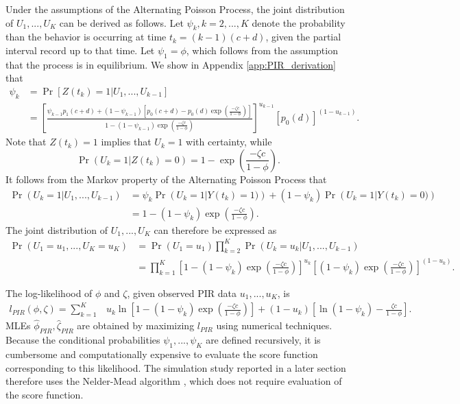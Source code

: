 \documentclass[man, noextraspace, floatsintext]{apa6}\usepackage[]{graphicx}\usepackage[]{color}
\begin{document}
Under the assumptions of the Alternating Poisson Process, the joint distribution of $U_1,...,U_K$ can be derived as follows. 
Let $\psi_k, k = 2,...,K$ denote the probability than the behavior is occurring at time $t_k = (k-1)(c + d)$, given the partial interval record up to that time. 
Let $\psi_1 = \phi$, which follows from the assumption that the process is in equilibrium. We show in Appendix \ref{app:PIR_derivation} that  
\begin{equation}
\label{eq:psi_k}
\begin{aligned}
\psi_k &= \Pr\left[ Z(t_k) = 1 \left| U_1,...,U_{k-1}\right.\right] \\
 &= \left[\frac{\psi_{k-1} p_1(c + d) + (1 - \psi_{k-1}) \left[p_0(c + d) - p_0(d) \exp\left(\frac{- \zeta c}{1 - \phi}\right)\right]}{1 - (1 - \psi_{k-1})\exp\left( \frac{-\zeta c}{1 - \phi}\right)}\right]^{u_{k-1}} \left[p_0(d)\right]^{(1 - u_{k-1})}.
\end{aligned}
\end{equation}
Note that $Z(t_k) = 1$ implies that $U_k = 1$ with certainty, while 
\[ \Pr\left(U_k = 1\left| Z(t_k) = 0\right.\right) = 1 - \exp\left( \frac{-\zeta c}{1 - \phi}\right).\]
It follows from the Markov property of the Alternating Poisson Process that 
\begin{align*}
\Pr\left(U_k = 1 \left| U_1,...,U_{k-1}\right.\right) &= \psi_k \Pr\left(U_k = 1 \left| Y(t_k) = 1)\right.\right)  + (1 - \psi_k)\Pr\left(U_k = 1 \left| Y(t_k) = 0)\right.\right) \\
&= 1 - (1 - \psi_k)\exp\left( \frac{-\zeta c}{1 - \phi}\right).
\end{align*}
The joint distribution of $U_1,...,U_K$ can therefore be expressed as 
\begin{align*}
\Pr\left(U_1=u_1,...,U_K = u_K\right) &= \Pr\left(U_1=u_1\right) \prod_{k=2}^K \Pr\left(U_k=u_k \left| U_1,...,U_{k-1}\right.\right) \nonumber \\
&= \prod_{k=1}^K \left[1 - (1 - \psi_k)\exp\left( \frac{-\zeta c}{1 - \phi}\right) \right]^{u_k} \left[(1 - \psi_k)\exp\left( \frac{-\zeta c}{1 - \phi}\right)\right]^{(1 - u_k)}.
\end{align*}

The log-likelihood of $\phi$ and $\zeta$, given observed PIR data $u_1,...,u_K$, is
\begin{align}
\label{eq:PIR_loglik}
l_{PIR}\left(\phi,\zeta\right) = \sum_{k=1}^K & u_k \ln\left[1 - (1 - \psi_k)\exp\left( \frac{-\zeta c}{1 - \phi}\right)\right]  + (1 - u_k)\left[\ln\left(1 - \psi_k \right) - \frac{\zeta c}{1 - \phi}\right].
\end{align}
MLEs $\hat\phi_{PIR}, \hat\zeta_{PIR}$ are obtained by maximizing $l_{PIR}$ using numerical techniques. 
Because the conditional probabilities $\psi_1,...,\psi_K$ are defined recursively, it is cumbersome and computationally expensive to evaluate the score function corresponding to this likelihood. 
The simulation study reported in a later section therefore uses the Nelder-Mead algorithm \citep{Nelder1965simplex}, which does not require evaluation of the score function.
\end{document}
